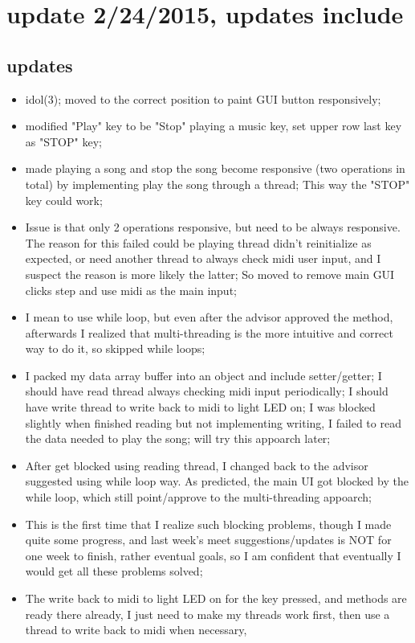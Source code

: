 \documentclass[9pt,b5paper]{article}
\begin{document}
\section{update 2/24/2015, updates include}
\label{sec-3}
\subsection{updates}
\label{sec-3-1}
\begin{itemize}
\item idol(3); moved to the correct position to paint GUI button responsively;
\item modified "Play" key to be "Stop" playing a music key, set upper row last key as "STOP" key;
\item made playing a song and stop the song become responsive (two operations in total) by implementing play the song through a thread; This way the "STOP" key could work;
\item Issue is that only 2 operations responsive, but need to be always responsive. The reason for this failed could be playing thread didn't reinitialize as expected, or need another thread to always check midi user input, and I suspect the reason is more likely the latter; So moved to remove main GUI clicks step and use midi as the main input;
\item I mean to use while loop, but even after the advisor approved the method, afterwards I realized that multi-threading is the more intuitive and correct way to do it, so skipped while loops;
\item I packed my data array buffer into an object and include setter/getter; I should have read thread always checking midi input periodically; I should have write thread to write back to midi to light LED on; I was blocked slightly when finished reading but not implementing writing, I failed to read the data needed to play the song; will try this appoarch later;
\item After get blocked using reading thread, I changed back to the advisor suggested using while loop way. As predicted, the main UI got blocked by the while loop, which still point/approve to the multi-threading appoarch;
\item This is the first time that I realize such blocking problems, though I made quite some progress, and last week's meet suggestions/updates is NOT for one week to finish, rather eventual goals, so I am confident that eventually I would get all these problems solved;
\item The write back to midi to light LED on for the key pressed, and methods are ready there already, I just need to make my threads work first, then use a thread to write back to midi when necessary,
\end{itemize}
\end{document}
